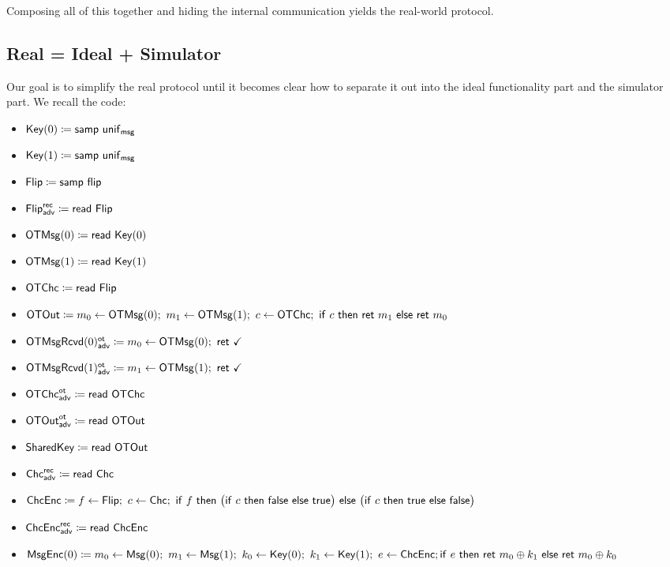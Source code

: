 Composing all of this together and hiding the internal communication yields the real-world protocol.

\subsection{Real = Ideal + Simulator}
Our goal is to simplify the real protocol until it becomes clear how to separate it out into the ideal functionality part and the simulator part. We recall the code:

\begin{itemize}
\item $\mathsf{Key}(0) \coloneqq \mathsf{samp} \ \mathsf{unif}_{\mathsf{msg}}$
\item $\mathsf{Key}(1) \coloneqq \mathsf{samp} \ \mathsf{unif}_{\mathsf{msg}}$
\item $\mathsf{Flip} \coloneqq \mathsf{samp} \ \mathsf{flip}$
\item {\color{blue} $\mathsf{Flip}^{\mathsf{rec}}_{\mathsf{adv}} \coloneqq \mathsf{read} \ \mathsf{Flip}$}
\item $\mathsf{OTMsg}(0) \coloneqq \mathsf{read} \ \mathsf{Key}(0)$
\item $\mathsf{OTMsg}(1) \coloneqq \mathsf{read} \ \mathsf{Key}(1)$
\item $\mathsf{OTChc} \coloneqq \mathsf{read} \ \mathsf{Flip}$
\item $\OTOut \coloneqq m_0 \leftarrow \OTMsg(0); \ m_1 \leftarrow \OTMsg(1); \ c \leftarrow \OTChc; \ \ifte{c}{\ret{m_1}}{\ret{m_0}}$
\item {\color{blue} $\LeakOTMsgRcvd(0)^\ot_\adv \coloneqq m_0 \leftarrow \OTMsg(0); \ \ret{\checkmark}$}
\item {\color{blue} $\LeakOTMsgRcvd(1)^\ot_\adv \coloneqq m_1 \leftarrow \OTMsg(1); \ \ret{\checkmark}$}
\item {\color{blue} $\mathsf{OTChc}^{\mathsf{ot}}_{\mathsf{adv}} \coloneqq \mathsf{read} \ \mathsf{OTChc}$}
\item {\color{blue} $\mathsf{OTOut}^{\mathsf{ot}}_{\mathsf{adv}} \coloneqq \mathsf{read} \ \mathsf{OTOut}$}
\item $\mathsf{SharedKey} \coloneqq \mathsf{read} \ \mathsf{OTOut}$
\item {\color{blue} $\mathsf{Chc}^{\mathsf{rec}}_{\mathsf{adv}} \coloneqq \mathsf{read} \ \mathsf{Chc}$}
\item $\ChcEnc \coloneqq f \leftarrow \Flip; \ c \leftarrow \Chc; \ \ifte{f}{\big(\ifte{c}{\false}{\true}\big)}{\big(\ifte{c}{\true}{\false}\big)}$
\item {\color{blue} $\mathsf{ChcEnc}^{\mathsf{rec}}_{\mathsf{adv}} \coloneqq \mathsf{read} \ \mathsf{ChcEnc}$}
\item $\mathsf{MsgEnc}(0) \coloneqq m_0 \leftarrow \mathsf{Msg}(0); \ m_1 \leftarrow \mathsf{Msg}(1); \ k_0 \leftarrow \mathsf{Key}(0); \ k_1 \leftarrow \mathsf{Key}(1); \ e \leftarrow \mathsf{ChcEnc}; \\ \mathsf{if} \ e \ \mathsf{then} \ \mathsf{ret} \ m_0 \oplus k_1 \ \mathsf{else} \ \mathsf{ret} \ m_0 \oplus k_0$

\end{itemize}
